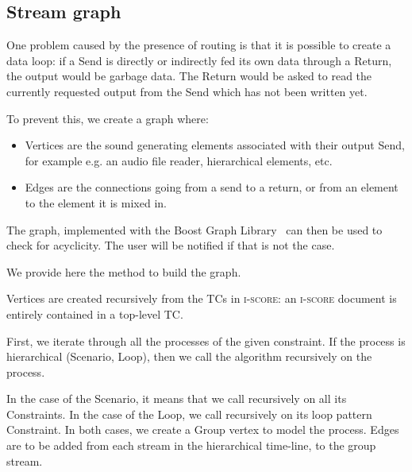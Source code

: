 \documentclass{article}
\newcommand*{\iscore}{\textsc{i-score}\xspace}
\newcommand*{\timeconstraint}{\ac{TC}\xspace}
\newcommand*{\timeconstraints}{\acp{TC}\xspace}
\begin{document}
\subsection{Stream graph}
One problem caused by the presence of routing is that it is possible 
to create a data loop: if a Send is directly or indirectly fed its own data through a Return, 
the output would be garbage data. 
The Return would be asked to read the currently requested output from the Send which has not been written yet.

To prevent this, we create a graph where: 
\begin{itemize}
	\item Vertices are the sound generating elements associated with their output Send, for example e.g. an audio file reader, hierarchical elements, etc.
	\item Edges are the connections going from a send to a return, or from an element to the element it is mixed in.
\end{itemize} 

The graph, implemented with the Boost Graph Library~\cite{siek2001boost} can then be used to 
check for acyclicity. 
The user will be notified if that is not the case.

We provide here the method to build the graph.

Vertices are created recursively from the \timeconstraints in \iscore: an \iscore document is entirely contained in a top-level \timeconstraint.

First, we iterate through all the processes of the given constraint.
If the process is hierarchical (Scenario, Loop), then we call the algorithm recursively on the process.

In the case of the Scenario, it means that we call recursively on all its Constraints.
In the case of the Loop, we call recursively on its loop pattern Constraint.
In both cases, we create a Group vertex to model the process. 
Edges are to be added from each stream in the hierarchical time-line, to the group stream.
\end{document}
